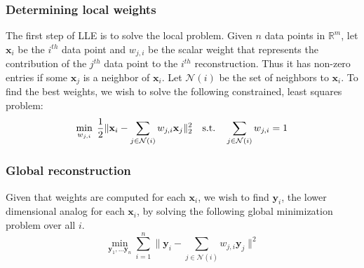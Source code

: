 \documentclass[11pt]{article}
\begin{document}
\begin{multicols}{2}
\subsubsection*{Determining local weights}
The first step of LLE is to solve the local problem. Given $n$ data points in $\mathbb{R}^m$, let $\mathbf{x}_i$ be the $i^{th}$ data point and $w_{j,i}$ be the scalar weight that represents the contribution of the $j^{th}$ data point to the $i^{th}$ reconstruction. Thus it has non-zero entries if some $\mathbf{x}_j$ is a neighbor of $\mathbf{x}_i$. Let $\mathcal{N}(i)$ be the set of neighbors to $\mathbf{x}_i$. To find the best weights, we wish to solve the following constrained, least squares problem:
\[
\min_{w_{j,i}} \; \frac{1}{2} \| \mathbf{x}_i - \sum_{j \in \mathcal{N}(i)} w_{j,i}\mathbf{x}_j \|_2^2 \quad \text{s.t.} \quad  \sum_{j \in \mathcal{N}(i)}w_{j,i} = 1 \\
\]

\subsubsection*{Global reconstruction}
Given that weights are computed for each $\mathbf{x}_i$, we wish to find $\mathbf{y}_i$, the lower dimensional analog for each $\mathbf{x}_i$, by solving the following global minimization problem over all $i$.
\[\min_{\mathbf{y}_1, \ldots \mathbf{y}_n} \sum_{i=1}^n \| \mathbf{y}_i - \sum_{j \in \mathcal{N}(i)} w_{j,i} \mathbf{y}_j \| ^2 \]


\end{multicols}
\end{document}
